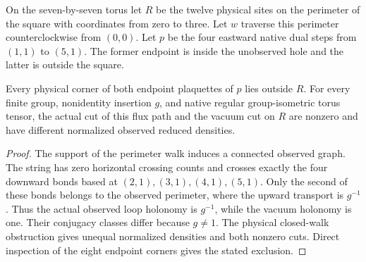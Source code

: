 \begin{definition}
    \label{def:peps_annular_flux_observation}
    \leanok
    On the seven-by-seven torus let $R$ be the twelve physical sites on
    the perimeter of the square with coordinates from zero to three.
    Let $w$ traverse this perimeter counterclockwise from $(0,0)$.
    Let $p$ be the four eastward native dual steps from $(1,1)$ to $(5,1)$.
    The former endpoint is inside the unobserved hole and the latter is
    outside the square.
\end{definition}

\begin{lemma}
    \label{lem:peps_annular_flux_density_obstruction}
    \leanok
    Every physical corner of both endpoint plaquettes of $p$ lies outside
    $R$. For every finite group, nonidentity insertion $g$, and native
    regular group-isometric torus tensor, the actual cut of this flux path
    and the vacuum cut on $R$ are nonzero and have different normalized
    observed reduced densities.
\end{lemma}
\begin{proof}\leanok
    The support of the perimeter walk induces a connected observed graph.
    The string has zero horizontal crossing counts and crosses exactly the
    four downward bonds based at $(2,1),(3,1),(4,1),(5,1)$.
    Only the second of these bonds belongs to the observed perimeter,
    where the upward transport is $g^{-1}$. Thus the actual observed loop
    holonomy is $g^{-1}$, while the vacuum holonomy is one.
    Their conjugacy classes differ because $g\ne1$. The physical closed-walk
    obstruction gives unequal normalized densities and both nonzero cuts.
    Direct inspection of the eight endpoint corners gives the stated exclusion.
\end{proof}

